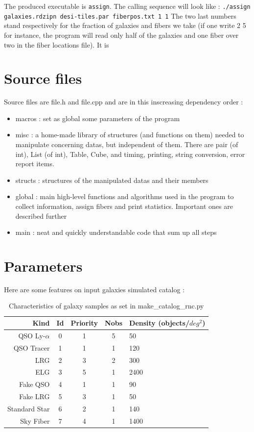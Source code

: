 \documentclass{extarticle}
\def\sqd{$deg^{2}$}
\begin{document}
The produced executable is {\tt assign}. The calling sequence will look like :
{\tt./assign galaxies.rdzipn desi-tiles.par fiberpos.txt 1 1}
The two last numbers stand respectively for the fraction of galaxies and fibers we take (if one write 2 5 for instance, the program will read only half of the galaxies and one fiber over two in the fiber locations file). It is 

\section{Source files}
Source files are file.h and file.cpp and are in this inscreasing dependency order :
\begin{itemize} 
	\item macros : set as global some parameters of the program
	\item misc : a home-made library of structures (and functions on them) needed to manipulate concerning datas, but independent of them. There are pair (of int), List (of int), Table, Cube, and timing, printing, string conversion, error report items.
	\item structs : structures of the manipulated datas and their members
	\item global : main high-level functions and algorithms used in the program to collect information, assign fibers and print statistics. Important ones are described further
	\item main : neat and quickly understandable code that sum up all steps
\end{itemize} 

\section{Parameters}
Here are some features on input galaxies simulated catalog :

\begin{table}[H]\centering
	\begin{tabular}{rcccl} \hline
		Kind&Id&Priority&Nobs&Density (objects/\sqd)\\ \hline
		QSO Ly-$\alpha$ & 0 & 1 & 5 & 50\\
		QSO Tracer & 1 & 1 & 1 & 120\\
		LRG & 2 & 3 & 2 & 300\\
		ELG & 3 & 5 & 1 & 2400\\
		Fake QSO & 4 & 1 & 1 & 90\\
		Fake LRG & 5 & 3 & 1 & 50\\
		Standard Star & 6 & 2 & 1 & 140\\
		Sky Fiber & 7 & 4 & 1 & 1400\\ \hline
	\end{tabular}
	\caption{Characteristics of galaxy samples as set in make\_catalog\_rnc.py}\label{table:characteristics}
\end{table}
\end{document}
